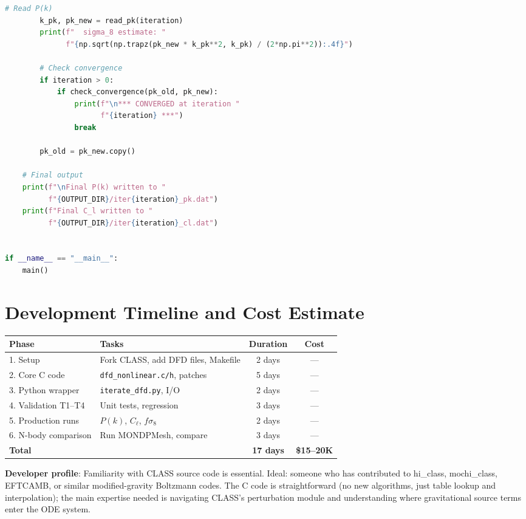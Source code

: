 \documentclass[11pt]{article}
\theoremstyle{definition}
\theoremstyle{remark}
\begin{document}
\begin{lstlisting}[language=Python,
  caption={iterate\_dfd.py --- Complete iteration wrapper},
  label={lst:python}]
        # Read P(k)
        k_pk, pk_new = read_pk(iteration)
        print(f"  sigma_8 estimate: "
              f"{np.sqrt(np.trapz(pk_new * k_pk**2, k_pk) / (2*np.pi**2)):.4f}")

        # Check convergence
        if iteration > 0:
            if check_convergence(pk_old, pk_new):
                print(f"\n*** CONVERGED at iteration "
                      f"{iteration} ***")
                break

        pk_old = pk_new.copy()

    # Final output
    print(f"\nFinal P(k) written to "
          f"{OUTPUT_DIR}/iter{iteration}_pk.dat")
    print(f"Final C_l written to "
          f"{OUTPUT_DIR}/iter{iteration}_cl.dat")


if __name__ == "__main__":
    main()
\end{lstlisting}


\section{Development Timeline and Cost Estimate}
\label{sec:timeline}

\begin{center}
\begin{tabular}{llcc}
\toprule
Phase & Tasks & Duration & Cost \\
\midrule
1. Setup & Fork CLASS, add DFD files, Makefile & 2 days & --- \\
2. Core C code & \texttt{dfd\_nonlinear.c/h}, patches & 5 days & --- \\
3. Python wrapper & \texttt{iterate\_dfd.py}, I/O & 2 days & --- \\
4. Validation T1--T4 & Unit tests, regression & 3 days & --- \\
5. Production runs & $P(k)$, $C_\ell$, $f\sigma_8$ & 2 days & --- \\
6. N-body comparison & Run MONDPMesh, compare & 3 days & --- \\
\midrule
\multicolumn{2}{l}{\textbf{Total}} & \textbf{17 days} & \textbf{\$15--20K} \\
\bottomrule
\end{tabular}
\end{center}

\textbf{Developer profile}: Familiarity with CLASS source code is essential.
Ideal: someone who has contributed to hi\_class, mochi\_class, EFTCAMB, or
similar modified-gravity Boltzmann codes. The C code is straightforward
(no new algorithms, just table lookup and interpolation); the main
expertise needed is navigating CLASS's perturbation module and understanding
where gravitational source terms enter the ODE system.
\end{document}
